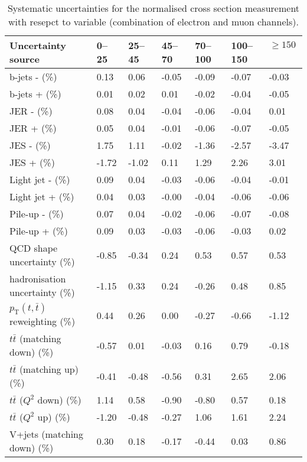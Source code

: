 \begin{table}[htp]
	\centering
	\hspace*{-1cm}
	\caption{Systematic uncertainties for the normalised \ttbar cross section
	measurement with resepct to \MET variable (combination of electron and muon channels).}
	\label{tab:combined_MET_systematics}
	\resizebox{\columnwidth}{!} {
	\begin{tabular}{l|l|l|l|l|l|l}
	\toprule
	Uncertainty source & 0--25~\GeV& 25--45~\GeV& 45--70~\GeV& 70--100~\GeV& 100--150~\GeV& $\geq 150$~\GeV \\
	\midrule
	b-jets - (\%) & 0.13 & 0.06 & -0.05 & -0.09 & -0.07 & -0.03\\ 
	b-jets + (\%) & 0.01 & 0.02 & 0.01 & -0.02 & -0.04 & -0.05\\ 
	\midrule
	JER - (\%) & 0.08 & 0.04 & -0.04 & -0.06 & -0.04 & 0.01\\ 
	JER + (\%) & 0.05 & 0.04 & -0.01 & -0.06 & -0.07 & -0.05\\ 
	\midrule
	JES - (\%) & 1.75 & 1.11 & -0.02 & -1.36 & -2.57 & -3.47\\ 
	JES + (\%) & -1.72 & -1.02 & 0.11 & 1.29 & 2.26 & 3.01\\ 
	\midrule
	Light jet - (\%) & 0.09 & 0.04 & -0.03 & -0.06 & -0.04 & -0.01\\ 
	Light jet + (\%) & 0.04 & 0.03 & -0.00 & -0.04 & -0.06 & -0.06\\ 
	\midrule
	Pile-up - (\%) & 0.07 & 0.04 & -0.02 & -0.06 & -0.07 & -0.08\\ 
	Pile-up + (\%) & 0.09 & 0.03 & -0.03 & -0.06 & -0.03 & 0.02\\ 
	\midrule
	QCD shape uncertainty (\%) & -0.85 & -0.34 & 0.24 & 0.53 & 0.57 & 0.53\\ 
	\midrule
	hadronisation uncertainty (\%) & -1.15 & 0.33 & 0.24 & -0.26 & 0.48 & 0.85\\ 
	\midrule
	$p_\mathrm{T}(t,\bar{t})$ reweighting (\%) & 0.44 & 0.26 & 0.00 & -0.27 & -0.66 & -1.12\\ 
	\midrule
	$t\bar{t}$ (matching down) (\%) & -0.57 & 0.01 & -0.03 & 0.16 & 0.79 & -0.18\\ 
	$t\bar{t}$ (matching up) (\%) & -0.41 & -0.48 & -0.56 & 0.31 & 2.65 & 2.06\\ 
	$t\bar{t}$ ($Q^{2}$ down) (\%) & 1.14 & 0.58 & -0.90 & -0.80 & 0.57 & 0.18\\ 
	$t\bar{t}$ ($Q^{2}$ up) (\%) & -1.20 & -0.48 & -0.27 & 1.06 & 1.61 & 2.24\\ 
	\midrule
	V+jets (matching down) (\%) & 0.30 & 0.18 & -0.17 & -0.44 & 0.03 & 0.86\\ 

\end{tabular}}
\end{table}
